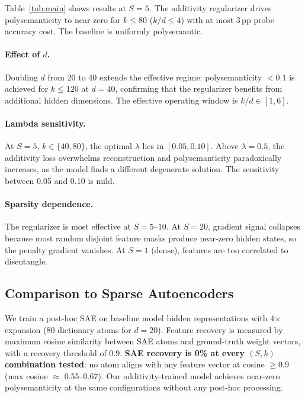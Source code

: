 \documentclass[11pt]{article}
\begin{document}
Table~\ref{tab:main} shows results at $S=5$. The additivity regularizer drives polysemanticity
to near zero for $k \leq 80$ ($k/d \leq 4$) with at most 3\,pp probe accuracy cost. The
baseline is uniformly polysemantic.

\paragraph{Effect of $d$.}
Doubling $d$ from 20 to 40 extends the effective regime: polysemanticity $< 0.1$ is achieved
for $k \leq 120$ at $d = 40$, confirming that the regularizer benefits from additional hidden
dimensions. The effective operating window is $k/d \in [1, 6]$.

\paragraph{Lambda sensitivity.}
At $S=5$, $k \in \{40, 80\}$, the optimal $\lambda$ lies in $[0.05, 0.10]$. Above $\lambda = 0.5$,
the additivity loss overwhelms reconstruction and polysemanticity paradoxically increases, as
the model finds a different degenerate solution. The sensitivity between 0.05 and 0.10 is mild.

\paragraph{Sparsity dependence.}
The regularizer is most effective at $S = 5$--$10$. At $S = 20$, gradient signal collapses
because most random disjoint feature masks produce near-zero hidden states, so the penalty
gradient vanishes. At $S = 1$ (dense), features are too correlated to disentangle.

\subsection{Comparison to Sparse Autoencoders}

We train a post-hoc SAE \citep{bricken2023monosemanticity} on baseline model hidden
representations with 4$\times$ expansion (80 dictionary atoms for $d=20$). Feature recovery
is measured by maximum cosine similarity between SAE atoms and ground-truth weight vectors,
with a recovery threshold of 0.9. \textbf{SAE recovery is 0\% at every $(S, k)$ combination
tested}: no atom aligns with any feature vector at cosine $\geq 0.9$ (max cosine $\approx$
0.55--0.67). Our additivity-trained model achieves near-zero polysemanticity at the same
configurations without any post-hoc processing.
\end{document}
